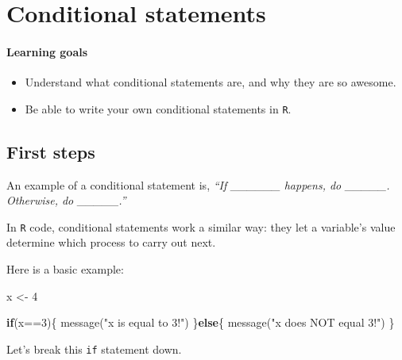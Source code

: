 \documentclass[
]{book}
\newenvironment{Shaded}{\begin{snugshade}}{\end{snugshade}}
\newcommand{\ControlFlowTok}[1]{\textcolor[rgb]{0.13,0.29,0.53}{\textbf{#1}}}
\newcommand{\DecValTok}[1]{\textcolor[rgb]{0.00,0.00,0.81}{#1}}
\newcommand{\FunctionTok}[1]{\textcolor[rgb]{0.00,0.00,0.00}{#1}}
\newcommand{\NormalTok}[1]{#1}
\newcommand{\OtherTok}[1]{\textcolor[rgb]{0.56,0.35,0.01}{#1}}
\newcommand{\SpecialCharTok}[1]{\textcolor[rgb]{0.00,0.00,0.00}{#1}}
\newcommand{\StringTok}[1]{\textcolor[rgb]{0.31,0.60,0.02}{#1}}
\providecommand{\tightlist}{%
  \setlength{\itemsep}{0pt}\setlength{\parskip}{0pt}}
\begin{document}
\hypertarget{conditional-statements}{%
\chapter{Conditional statements}\label{conditional-statements}}

\hypertarget{learning-goals-17}{%
\subsubsection*{Learning goals}\label{learning-goals-17}}

\begin{itemize}
\tightlist
\item
  Understand what conditional statements are, and why they are so awesome.
\item
  Be able to write your own conditional statements in \texttt{R}.
\end{itemize}

\hypertarget{first-steps-1}{%
\section*{First steps}\label{first-steps-1}}

An example of a conditional statement is, \emph{``If \_\_\_\_\_\_ happens, do \_\_\_\_\_. Otherwise, do \_\_\_\_\_.''}

In \texttt{R} code, conditional statements work a similar way: they let a variable's value determine which process to carry out next.

Here is a basic example:

\begin{Shaded}
\begin{Highlighting}[]
\NormalTok{x }\OtherTok{\textless{}{-}} \DecValTok{4}

\ControlFlowTok{if}\NormalTok{(x}\SpecialCharTok{==}\DecValTok{3}\NormalTok{)\{}
  \FunctionTok{message}\NormalTok{(}\StringTok{"x is equal to 3!"}\NormalTok{)}
\NormalTok{\}}\ControlFlowTok{else}\NormalTok{\{}
  \FunctionTok{message}\NormalTok{(}\StringTok{"x does NOT equal 3!"}\NormalTok{)}
\NormalTok{\}}
\end{Highlighting}
\end{Shaded}

Let's break this \texttt{if} statement down.
\end{document}
